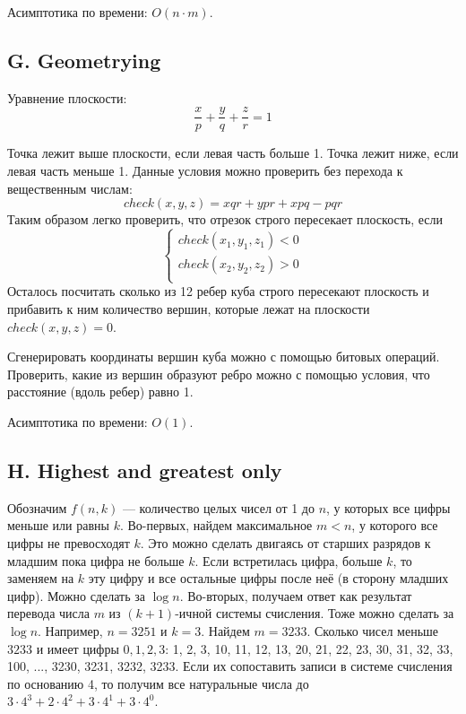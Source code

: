 \documentclass[12pt, a4paper]{article}
\begin{document}
Асимптотика по времени: $O(n \cdot m)$.



\newpage

\subsection*{G. Geometrying}

Уравнение плоскости:
$$ \frac{x}{p} + \frac{y}{q} + \frac{z}{r} = 1$$

Точка лежит выше плоскости, если левая часть больше 1. Точка лежит ниже, если левая часть меньше 1. Данные условия можно проверить без перехода к вещественным числам:
$$ check(x, y, z) = x q r + y p r + x p q - p q r$$
Таким образом легко проверить, что отрезок строго пересекает плоскость, если
$$
\begin{cases}
check(x_1, y_1, z_1) < 0 \\
check(x_2, y_2, z_2) > 0 \\
\end{cases}
$$
Осталось посчитать сколько из 12 ребер куба строго пересекают плоскость и прибавить к ним количество вершин, которые лежат на плоскости $check(x, y, z) = 0$. 

Сгенерировать координаты вершин куба можно с помощью битовых операций. Проверить, какие из вершин образуют ребро можно с помощью условия, что расстояние (вдоль ребер) равно 1.

Асимптотика по времени: $O(1)$.



\newpage

\subsection*{H. Highest and greatest only}

Обозначим $f(n, k)$ --- количество целых чисел от 1 до $n$, у которых все цифры меньше или равны $k$. Во-первых, найдем максимальное $m < n$, у которого все цифры не превосходят $k$. Это можно сделать двигаясь от старших разрядов к младшим пока цифра не больше $k$. Если встретилась цифра, больше $k$, то заменяем на $k$ эту цифру и все остальные цифры после неё (в сторону младших цифр). Можно сделать за $\log n$. Во-вторых, получаем ответ как результат перевода числа $m$ из $(k + 1)$-ичной системы счисления. Тоже можно сделать за $\log n$. Например, $n = 3251$ и $k = 3$. Найдем $m = 3233$. Сколько чисел меньше $3233$ и имеет цифры $0, 1, 2, 3$: 1, 2, 3, 10, 11, 12, 13, 20, 21, 22, 23, 30, 31, 32, 33, 100, ..., 3230, 3231, 3232, 3233. Если их сопоставить записи в системе счисления по основанию 4, то получим все натуральные числа до $3 \cdot 4^3 + 2 \cdot 4^2 + 3 \cdot 4^1 + 3 \cdot 4^0$.
\end{document}
